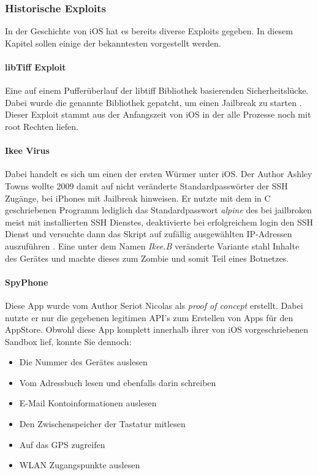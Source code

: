 	\subsubsection{Historische Exploits}
		In der Geschichte von iOS hat es bereits diverse Exploits \cite{Exploit2015}
		gegeben. In diesem Kapitel sollen einige der bekanntesten vorgestellt werden.
		\paragraph{libTiff Exploit} 
			Eine auf einem Pufferüberlauf der libtiff Bibliothek basierenden
			Sicherheitslücke. Dabei wurde die genannte Bibliothek gepatcht, um einen
			Jailbreak zu starten \cite{LibTiffExploit2015}. Dieser Exploit
			stammt aus der Anfangszeit von iOS in der alle Prozesse noch mit root
			Rechten liefen.
		\paragraph{Ikee Virus}\label{sec:ikee-exploit}
			Dabei handelt es sich um einen der ersten Würmer unter iOS. Der	Author Ashley Towns
			wollte 2009 damit auf nicht veränderte Standardpasswörter der SSH Zugänge,
			bei iPhones mit Jailbreak hinweisen. Er nutzte mit dem in C geschriebenen
			Programm lediglich das Standardpasswort \textsl{alpine} des bei jailbroken
			meist mit installierten SSH Dienstes, deaktivierte bei erfolgreichem login
			den SSH Dienst und versuchte dann das Skript auf zufällig ausgewählten
			IP-Adressen auszuführen \cite{IkeeExploit2009}. Eine unter dem Namen
			\textsl{Ikee.B} veränderte Variante stahl Inhalte des Gerätes und machte
			dieses zum Zombie und somit Teil eines Botnetzes.
		\paragraph{SpyPhone}
			Diese App wurde vom Author Seriot Nicolas als
			\textsl{proof of concept} erstellt. Dabei nutzte er nur die gegebenen
			legitimen API's zum Erstellen von Apps für den AppStore. Obwohl diese App
			komplett innerhalb ihrer von iOS vorgeschriebenen Sandbox lief, konnte
			Sie dennoch:
			\begin{itemize}\itemsep0pt
				\item{Die Nummer des Gerätes auslesen}
				\item{Vom Adressbuch lesen und ebenfalls darin schreiben}
				\item{E-Mail Kontoinformationen auslesen}
				\item{Den Zwischenspeicher der Tastatur mitlesen}
				\item{Auf das GPS zugreifen}
				\item{WLAN Zugangspunkte auslesen}
			\end{itemize}
			
